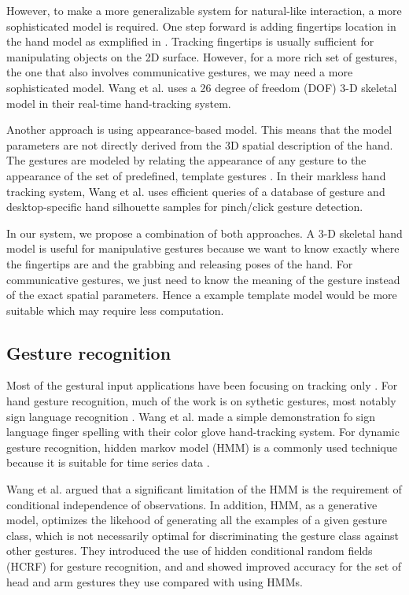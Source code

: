 However, to make a more generalizable system for natural-like interaction, a
more sophisticated model is required. One step forward is adding fingertips
location in the hand model as exmplified in \cite{Oka02} \cite{harrison11}
\cite{larson11}. Tracking fingertips is usually sufficient for manipulating
objects on the 2D surface. However, for a more rich set of gestures, the one
that also involves communicative gestures, we may need a more sophisticated
model. Wang et al. \cite{Wang09} uses a 26 degree of freedom (DOF) 3-D skeletal
model in their real-time hand-tracking system. 

Another approach is using appearance-based model. This means that the model
parameters are not directly derived from the 3D spatial description of the hand.
The gestures are modeled by relating the appearance of any gesture to the 
appearance of the set of predefined, template gestures \cite{Pavlovic97}. In
their markless hand tracking system, Wang et al. \cite{wang11} uses efficient
queries of a database of gesture and desktop-specific hand silhouette samples
for pinch/click gesture detection.

In our system, we propose a combination of both approaches. A 3-D skeletal hand
model is useful for manipulative gestures because we want to know exactly where
the fingertips are and the grabbing and releasing poses of the hand. For
communicative gestures, we just need to know the meaning of the gesture instead
of the exact spatial parameters. Hence a example template model would be more
suitable which may require less computation.

\subsection{Gesture recognition}
Most of the gestural input applications have been focusing on tracking only
\cite{harrison11} \cite{larson11}. For hand gesture recognition, much of the
work is on sythetic gestures, most notably sign language recognition
\cite{Bauer00} \cite{kadous02}. Wang et al. \cite{Wang09} made a simple
demonstration fo sign language finger spelling with their color glove hand-tracking system. 
For dynamic gesture recognition, hidden markov model (HMM) is a commonly used
technique because it is suitable for time series data \cite{sharma00}. 

Wang et al. \cite{wang06} argued that a significant limitation of the
HMM is the requirement of conditional independence of observations. In
addition, HMM, as a generative model, optimizes the likehood of
generating all the examples of a given gesture class, which is not
necessarily optimal for discriminating the gesture class against other
gestures. They introduced the use of hidden conditional random fields (HCRF) for
gesture recognition, and and showed improved accuracy for the set of head and
arm gestures they use compared with using HMMs. 

